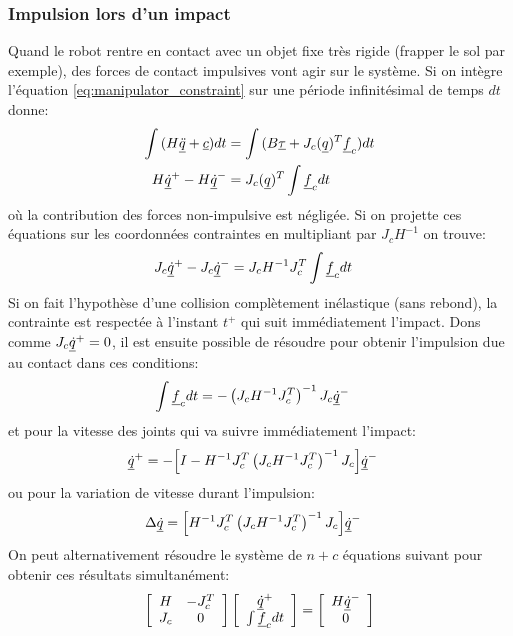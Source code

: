 \subsubsection{Impulsion lors d'un impact}
\label{sec:impact}
%
Quand le robot rentre en contact avec un objet fixe très rigide (frapper le sol par exemple), des forces de contact impulsives vont agir sur le système. Si on intègre l'équation \eqref{eq:manipulator_constraint} sur une période infinitésimal de temps $dt$ donne:
%
\begin{align}
\int{ ( H \underline{\ddot{q}} + \underline{c} ) dt } &= \int{ ( B \underline{\tau} + J_c( \underline{ q } )^T  \underline{f}_c ) dt } \\
H \underline{\dot{q}}^+ - H \underline{\dot{q}}^- &= J_c( \underline{ q } )^T  \int{  \underline{f}_c dt }
\label{eq:manipulator_impact}
\end{align}
%
où la contribution des forces non-impulsive est négligée. Si on projette ces équations sur les coordonnées contraintes en multipliant par $J_c H^{-1}$ on trouve:
%
\begin{align}
J_c \underline{\dot{q}}^+ - J_c \underline{\dot{q}}^- &= J_c H^{-1} J_c^T  \int{  \underline{f}_c dt }
\label{eq:manipulator_impact2}
\end{align}
%
Si on fait l'hypothèse d'une collision complètement inélastique (sans rebond), la contrainte est respectée à l'instant $t^+$ qui suit immédiatement l'impact. Dons comme $J_c \underline{\dot{q}}^+=0$, il est ensuite possible de résoudre pour obtenir l'impulsion due au contact dans ces conditions:
\begin{align}
\int{  \underline{f}_c dt } &= - \left( J_c H^{-1} J_c^T \right)^{-1}  J_c \underline{\dot{q}}^-
\label{eq:manipulator_impact_force}
\end{align}
%
et pour la vitesse des joints qui va suivre immédiatement l'impact:
%
\begin{align}
\underline{\dot{q}}^+ &= - \Big[ I - H^{-1} J_c^T \left( J_c H^{-1} J_c^T \right)^{-1} J_c \Big] \underline{\dot{q}}^-
\label{eq:manipulator_impact_velocity}
\end{align}
%
ou pour la variation de vitesse durant l'impulsion:
%
\begin{align}
\Delta \underline{\dot{q}} &=  \Big[ H^{-1} J_c^T \left( J_c H^{-1} J_c^T \right)^{-1} J_c \Big] \underline{\dot{q}}^-
\label{eq:manipulator_impact_velocity_delta}
\end{align}
%
On peut alternativement résoudre le système de $n+c$ équations suivant pour obtenir ces résultats simultanément:
%
\begin{align}
\left[ \begin{array}{c c } 	H & -J_c^T  \\ J_c 	& 0  	\end{array} \right] \left[ \begin{array}{c} \underline{\dot{q}}^+  \\ \int{ \underline{f}_c dt }\end{array} \right] = \left[ \begin{array}{c}  	H \underline{\dot{q}}^-   \\ 0  \end{array} \right]
\label{eq:manipulator_impact_eom}
\end{align}


